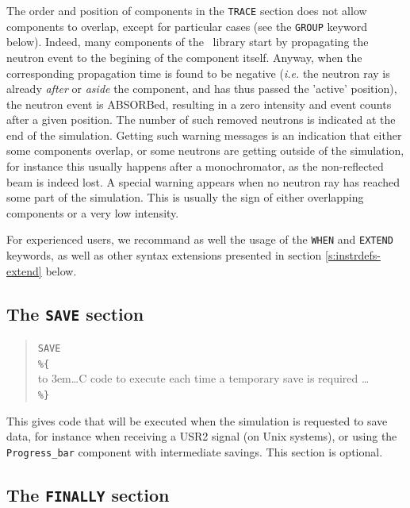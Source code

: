 The order and position of components in the \texttt{TRACE} section does not
allow components to overlap, except for particular cases (see the \texttt{GROUP} keyword below).
Indeed, many components of the \MCS\ library  start
by propagating the neutron event to the begining of the component itself.
Anyway, when the corresponding propagation time is found to be negative
({\it i.e.} the neutron ray is already \emph{after} or \emph{aside} the component, and has thus
passed the 'active' position), the neutron event is ABSORBed, resulting in a zero intensity and event counts after a given position. The number of such removed neutrons is indicated at the end of the simulation.
Getting such warning messages is an indication that either some
components overlap, or some neutrons are getting outside of the
simulation, for instance this usually happens after a monochromator,
as the non-reflected beam is indeed lost. A special warning appears
when no neutron ray has reached some part of the simulation. This is usually the sign of either overlapping components or a very low intensity. 

For experienced users, we recommand as well the usage of the \texttt{WHEN} and \texttt{EXTEND} keywords, as well as other syntax extensions presented in section \ref{s:instrdefs-extend} below.

\subsection{The \texttt{SAVE} section}
\label{s:save}

\begin{quote}
  \texttt{SAVE} \\
  \verb|%{| \\
  \hbox to 3em{}\ldots C code to execute each time a temporary save is required \ldots \\
  \verb|%}|
\end{quote} 
This gives code that will be executed when the simulation is requested to save data, for instance when receiving a USR2 signal (on Unix systems), or using the \verb+Progress_bar+ component with intermediate savings. This section is optional.

\subsection{The \texttt{FINALLY} section}
\label{s:finally}

